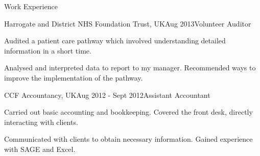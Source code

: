 \documentclass{resume} %
\begin{document}
\begin{rSection}{Work Experience}

\begin{rSubsection}{Harrogate and District NHS Foundation Trust, UK}{Aug 2013}{Volunteer Auditor}{}
\item Audited a patient care pathway which involved understanding detailed information in a short time.
\item Analysed and interpreted data to report to my manager. Recommended ways to improve the implementation of the pathway. 
\end{rSubsection}


\pagebreak
\begin{rSubsection}{CCF Accountancy, UK}{Aug 2012 - Sept 2012}{Assistant Accountant}{}
\item Carried out basic accounting and bookkeeping. Covered the front desk, directly interacting with clients.
\item Communicated with clients to obtain necessary information. Gained experience with SAGE and Excel. 
\end{rSubsection}




\end{rSection}

\end{document}
